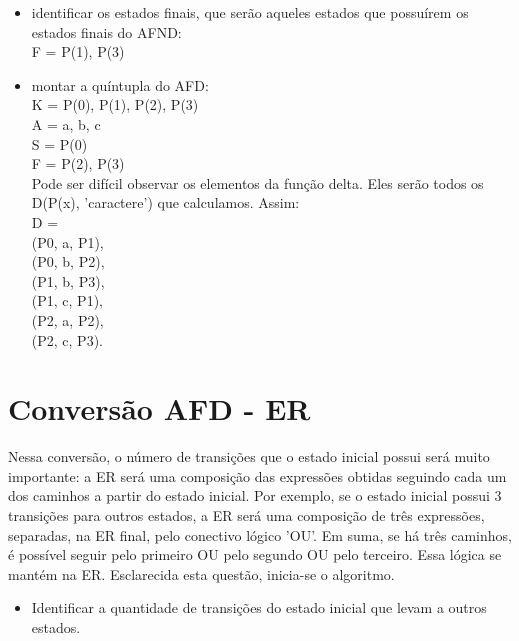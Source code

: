 \documentclass[a4paper,10pt]{article} %
\begin{document}
{\begin{itemize}
        \item identificar os estados finais, que serão aqueles estados que possuírem os estados finais do AFND:
            \\F = {P(1), P(3)}
        \item montar a quíntupla do AFD:
            \\K = {P(0), P(1), P(2), P(3)}\\A = {a, b, c}\\S = {P(0)}\\F = {P(2), P(3)}\\Pode ser difícil observar os elementos da função delta. Eles serão todos os D(P(x), 'caractere') que calculamos. Assim:\\D =\\(P0, a, P1),\\(P0, b, P2),\\(P1, b, P3),\\(P1, c, P1),\\(P2, a, P2),\\(P2, c, P3).
    \end{itemize}
    \begin{center}
    \end{center}

\section{Conversão AFD - ER}
    Nessa conversão, o número de transições que o estado inicial possui será muito importante: a ER será uma composição das expressões obtidas seguindo cada um dos caminhos a partir do estado inicial. Por exemplo, se o estado inicial possui 3 transições para outros estados, a ER será uma composição de três expressões, separadas, na ER final, pelo conectivo lógico 'OU'. Em suma, se há três caminhos, é possível seguir pelo primeiro OU pelo segundo OU pelo terceiro. Essa lógica se mantém na ER. Esclarecida esta questão, inicia-se o algoritmo.
    \begin{itemize}
        \item Identificar a quantidade de transições do estado inicial que levam a outros estados.
    \end{itemize}

}
\end{document}
